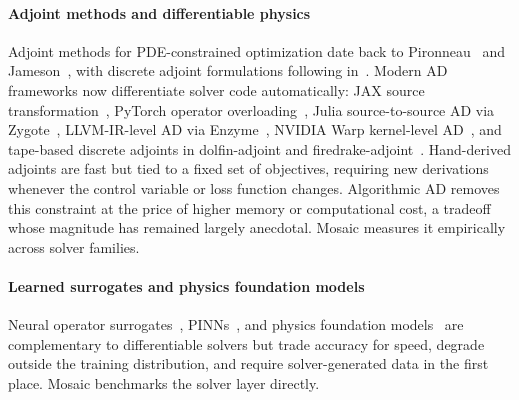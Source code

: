 \documentclass[11pt,a4paper]{article}
\begin{document}
\paragraph{Adjoint methods and differentiable physics}
Adjoint methods for PDE-constrained optimization date back to
Pironneau~\cite{pironneau1974optimum} and
Jameson~\cite{jameson1988aerodynamic}, with discrete adjoint
formulations following in~\cite{giles2000introduction,nadarajah2000studies}.
Modern AD frameworks now differentiate solver code automatically:
JAX source transformation~\cite{bradbury2018jax}, PyTorch operator
overloading~\cite{paszke2019pytorch}, Julia source-to-source AD via
Zygote~\cite{innes2018don}, LLVM-IR-level AD via
Enzyme~\cite{moses2020enzyme}, NVIDIA
Warp kernel-level AD~\cite{macklin2024warp}, and tape-based discrete
adjoints in dolfin-adjoint and
firedrake-adjoint~\cite{farrell2013automated}.
Hand-derived adjoints are fast but tied to a fixed set of objectives,
requiring new derivations whenever the control variable or loss function
changes. Algorithmic AD removes this constraint at the price of higher
memory or computational cost, a tradeoff whose magnitude has remained
largely anecdotal. Mosaic measures it empirically across solver families.

\paragraph{Learned surrogates and physics foundation models}
Neural operator surrogates~\cite{kovachki2023neural,li2021fourier,lu2021learning},
PINNs~\cite{raissi2019physics}, and physics foundation
models~\cite{pathak2022fourcastnet,bodnar2024aurora,price2024gencast,hao2024dpot,herde2024poseidon}
are complementary to differentiable solvers but trade accuracy for speed,
degrade outside the training distribution, and require solver-generated
data in the first place. Mosaic benchmarks the solver layer directly.
\end{document}
